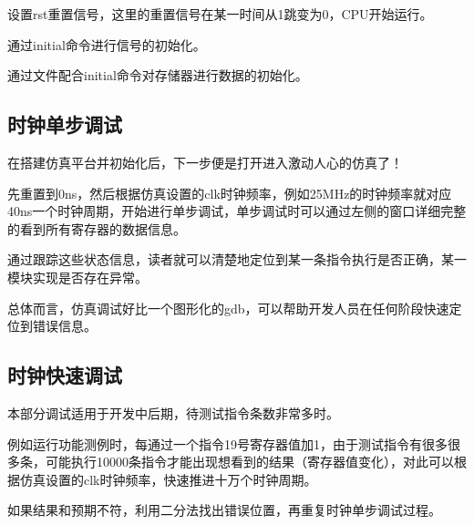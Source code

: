 设置rst重置信号，这里的重置信号在某一时间从1跳变为0，CPU开始运行。

通过initial命令进行信号的初始化。

通过文件配合initial命令对存储器进行数据的初始化。

\subsection{时钟单步调试}

在搭建仿真平台并初始化后，下一步便是打开进入激动人心的仿真了！

先重置到0ns，然后根据仿真设置的clk时钟频率，例如25MHz的时钟频率就对应40ns一个时钟周期，开始进行单步调试，单步调试时可以通过左侧的窗口详细完整的看到所有寄存器的数据信息。

通过跟踪这些状态信息，读者就可以清楚地定位到某一条指令执行是否正确，某一模块实现是否存在异常。

总体而言，仿真调试好比一个图形化的gdb，可以帮助开发人员在任何阶段快速定位到错误信息。

\subsection{时钟快速调试}

本部分调试适用于开发中后期，待测试指令条数非常多时。

例如运行功能测例时，每通过一个指令19号寄存器值加1，由于测试指令有很多很多条，可能执行10000条指令才能出现想看到的结果（寄存器值变化），对此可以根据仿真设置的clk时钟频率，快速推进十万个时钟周期。

如果结果和预期不符，利用二分法找出错误位置，再重复时钟单步调试过程。
